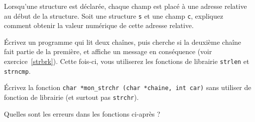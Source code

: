 \question

Lorsqu'une structure est déclarée, chaque champ est placé à une adresse
relative au début de la structure.  Soit une structure {\tt s} et une
champ {\tt c}, expliquez comment obtenir la valeur numérique de cette
adresse relative.


\question

Écrivez un programme qui lit deux chaînes, puis cherche si la deuxième
chaîne fait partie de la première, et affiche un message en conséquence
(voir exercice~\ref {strbrk}).  Cette fois-ci, vous utiliserez les
fonctions de librairie {\tt strlen} et {\tt strncmp}.


\question

Écrivez la fonction \verb:char *mon_strchr (char *chaine, int car):
sans utiliser de fonction de librairie (et surtout pas {\tt strchr}).


\question

Quelles sont les erreurs dans les fonctions ci-après ?
%

